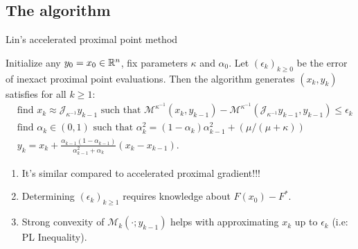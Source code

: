 \documentclass[11pt]{beamer}
\begin{document}
        \subsection{The algorithm}
            \begin{frame}{Lin's accelerated proximal point method}
                \begin{definition}
                    Initialize any $y_0 = x_0 \in \mathbb R^n$, fix parameters $\kappa$ and $\alpha_0$. 
                    Let $(\epsilon_k)_{k \ge 0}$ be the error of inexact proximal point evaluations. 
                    Then the algorithm generates $(x_k, y_k)$ satisfies for all $k \ge 1$: 
                    {\small
                    \begin{align*}
                        & \text{find } x_k \approx \mathcal J_{\kappa^{-1}} y_{k - 1} \text{ such that } \mathcal M^{\kappa^{-1}}(x_k, y_{k - 1}) - \mathcal M^{\kappa^{-1}}(\mathcal J_{\kappa^{-1}}y_{k - 1}, y_{k - 1}) \le \epsilon_k
                        \\
                        & \text{find } \alpha_k \in (0, 1) \text{ such that } \alpha_k^2 = (1 - \alpha_k)\alpha_{k - 1}^2 + (\mu/(\mu + \kappa)) 
                        \\
                        & 
                        y_{k} = x_k + \frac{\alpha_{k - 1}(1 - \alpha_{k - 1})}{\alpha_{k - 1}^2 + \alpha_k}(x_k - x_{k - 1}). 
                    \end{align*}
                    }
                \end{definition}
                \pause
                \begin{enumerate}
                    \item It's similar compared to accelerated proximal gradient!!!
                    \item Determining $(\epsilon_k)_{k \ge 1}$ requires knowledge about $F(x_0) - F^*$. 
                    \item Strong convexity of $\mathcal M_k(\cdot; y_{k - 1})$ helps with approximating $x_k$ up to $\epsilon_k$ (i.e: PL Inequality). 
                \end{enumerate}
            \end{frame}
\end{document}
